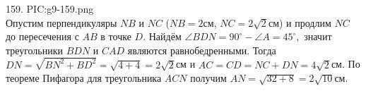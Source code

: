 159. {{PIC:g9-159.png}}\\
Опустим перпендикуляры $NB$ и $NC$ ($NB=2$см, $NC=2\sqrt{2}$см) и продлим $NC$ до пересечения с $AB$ в точке $D.$ Найдём $\angle BDN=90^\circ-\angle A=45^\circ,$ значит треугольники $BDN$ и $CAD$ являются равнобедренными. Тогда $DN=\sqrt{BN^2+BD^2}=\sqrt{4+4}=2\sqrt{2}$см и $AC=CD=NC+DN=4\sqrt{2}$см. По теореме Пифагора для треугольника $ACN$ получим $AN=\sqrt{32+8}=2\sqrt{10}$см.\\

